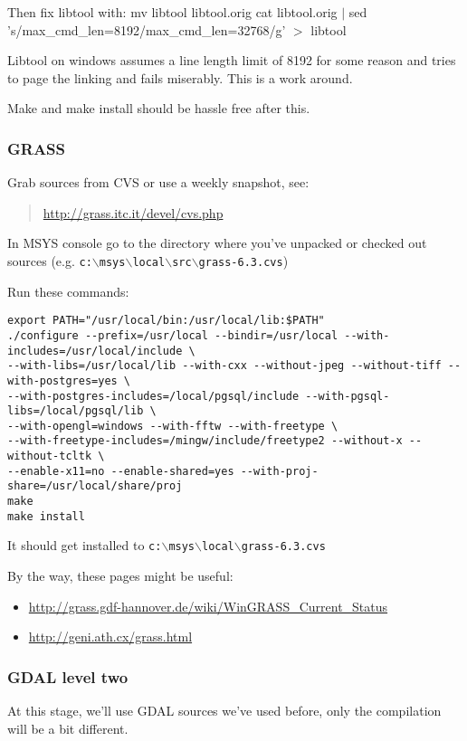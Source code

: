 Then fix libtool with:
mv libtool libtool.orig
cat libtool.orig $|$ sed 's/max\_cmd\_len=8192/max\_cmd\_len=32768/g' $>$ libtool

Libtool on windows assumes a line length limit of 8192 for some reason and tries to page the linking and fails miserably. This is a work around.

Make and make install should be hassle free after this.

\subsubsection{GRASS}
Grab sources from CVS or use a weekly snapshot, see:

	\begin{quotation}
\url{http://grass.itc.it/devel/cvs.php}
	\end{quotation}

In MSYS console go to the directory where you've unpacked or checked out sources
(e.g. \texttt{c:$\backslash$msys$\backslash$local$\backslash$src$\backslash$grass-6.3.cvs})

Run these commands:

\begin{verbatim}
export PATH="/usr/local/bin:/usr/local/lib:$PATH"
./configure --prefix=/usr/local --bindir=/usr/local --with-includes=/usr/local/include \
--with-libs=/usr/local/lib --with-cxx --without-jpeg --without-tiff --with-postgres=yes \
--with-postgres-includes=/local/pgsql/include --with-pgsql-libs=/local/pgsql/lib \
--with-opengl=windows --with-fftw --with-freetype \
--with-freetype-includes=/mingw/include/freetype2 --without-x --without-tcltk \
--enable-x11=no --enable-shared=yes --with-proj-share=/usr/local/share/proj
make
make install
\end{verbatim}

It should get installed to \texttt{c:$\backslash$msys$\backslash$local$\backslash$grass-6.3.cvs}

By the way, these pages might be useful:

\begin{itemize}
\item \url{http://grass.gdf-hannover.de/wiki/WinGRASS\_Current\_Status}
\item \url{http://geni.ath.cx/grass.html}
\end{itemize}

\subsubsection{GDAL level two}
At this stage, we'll use GDAL sources we've used before, only the compilation will be a bit different.

